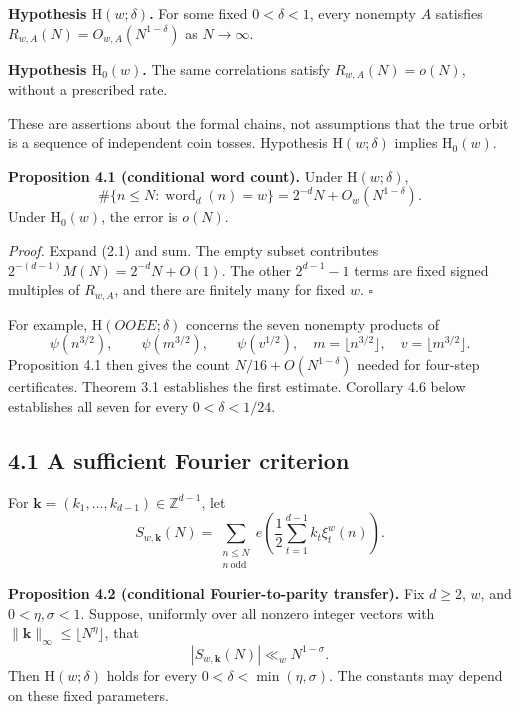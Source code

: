 \documentclass[11pt,a4paper]{article}
\begin{document}

\textbf{Hypothesis \(\mathrm H(w;\delta)\).} For some fixed
\(0<\delta<1\), every nonempty \(A\) satisfies
\(R_{w,A}(N)=O_{w,A}(N^{1-\delta})\) as \(N\to\infty\).


\textbf{Hypothesis \(\mathrm H_0(w)\).} The same correlations satisfy
\(R_{w,A}(N)=o(N)\), without a prescribed rate.

These are assertions about the formal chains, not assumptions that the
true orbit is a sequence of independent coin tosses. Hypothesis
\(\mathrm H(w;\delta)\) implies \(\mathrm H_0(w)\).


\textbf{Proposition 4.1 (conditional word count).} Under
\(\mathrm H(w;\delta)\), \[
\#\{n\le N:\operatorname{word}_d(n)=w\}
=2^{-d}N+O_w(N^{1-\delta}).
\tag{4.1}
\] Under \(\mathrm H_0(w)\), the error is \(o(N)\).

\emph{Proof.} Expand (2.1) and sum. The empty subset contributes
\(2^{-(d-1)}M(N)=2^{-d}N+O(1)\). The other \(2^{d-1}-1\) terms are fixed
signed multiples of \(R_{w,A}\), and there are finitely many for fixed
\(w\). \(\square\)

For example, \(\mathrm H(OOEE;\delta)\) concerns the seven nonempty
products of \[
\psi(n^{3/2}),\qquad \psi(m^{3/2}),\qquad \psi(v^{1/2}),
\quad m=\lfloor n^{3/2}\rfloor,\quad v=\lfloor m^{3/2}\rfloor.
\] Proposition 4.1 then gives the count \(N/16+O(N^{1-\delta})\) needed
for four-step certificates. Theorem 3.1 establishes the first estimate.
Corollary 4.6 below establishes all seven for every \(0<\delta<1/24\).

\subsection{4.1 A sufficient Fourier
criterion}\label{a-sufficient-fourier-criterion}

For \(\mathbf k=(k_1,\ldots,k_{d-1})\in\mathbb Z^{d-1}\), let \[
S_{w,\mathbf k}(N)=\sum_{\substack{n\le N\\n\ \mathrm{odd}}}
e\left(\frac12\sum_{t=1}^{d-1}k_t\xi_t^w(n)\right).
\]


\textbf{Proposition 4.2 (conditional Fourier-to-parity transfer).} Fix
\(d\ge2\), \(w\), and \(0<\eta,\sigma<1\). Suppose, uniformly over all
nonzero integer vectors with
\(\|\mathbf k\|_\infty\le\lfloor N^\eta\rfloor\), that \[
|S_{w,\mathbf k}(N)|\ll_w N^{1-\sigma}.
\tag{4.2}
\] Then \(\mathrm H(w;\delta)\) holds for every
\(0<\delta<\min(\eta,\sigma)\). The constants may depend on these fixed
parameters.
\end{document}
